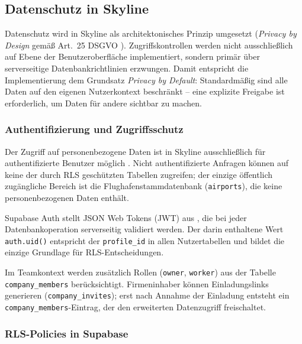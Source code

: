 \subsection{Datenschutz in Skyline}

Datenschutz wird in Skyline als architektonisches Prinzip umgesetzt
(\emph{Privacy by Design} gemäß Art.~25 DSGVO \cite{edpbArt25}).
Zugriffskontrollen werden nicht ausschließlich auf Ebene der
Benutzeroberfläche implementiert, sondern primär über
serverseitige Datenbankrichtlinien erzwungen.
Damit entspricht die Implementierung dem Grundsatz
\emph{Privacy by Default}: Standardmäßig sind alle Daten
auf den eigenen Nutzerkontext beschränkt -- eine explizite
Freigabe ist erforderlich, um Daten für andere sichtbar zu machen.

\subsubsection{Authentifizierung und Zugriffsschutz}

Der Zugriff auf personenbezogene Daten ist in Skyline ausschließlich
für authentifizierte Benutzer möglich \cite{supabaseAuth}.
Nicht authentifizierte Anfragen können auf keine der durch RLS
geschützten Tabellen zugreifen; der einzige öffentlich zugängliche
Bereich ist die Flughafenstammdatenbank (\texttt{airports}),
die keine personenbezogenen Daten enthält.

Supabase Auth stellt JSON Web Tokens (JWT) aus \cite{rfc7519},
die bei jeder Datenbankoperation serverseitig validiert werden.
Der darin enthaltene Wert \texttt{auth.uid()} entspricht der
\texttt{profile\_id} in allen Nutzertabellen und bildet die
einzige Grundlage für RLS-Entscheidungen.

Im Teamkontext werden zusätzlich Rollen (\texttt{owner},
\texttt{worker}) aus der Tabelle \texttt{company\_members}
berücksichtigt.
Firmeninhaber können Einladungslinks generieren
(\texttt{company\_invites}); erst nach Annahme der Einladung
entsteht ein \texttt{company\_members}-Eintrag, der den
erweiterten Datenzugriff freischaltet.

\subsubsection{RLS-Policies in Supabase}

